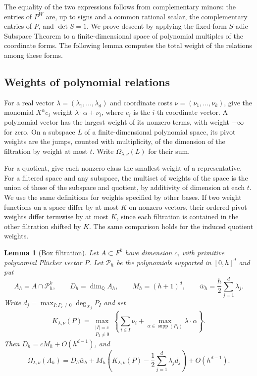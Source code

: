 \documentclass[11pt,a4paper,reqno]{amsart}
\newtheorem{lemma}[theorem]{Lemma}
\theoremstyle{definition}
\theoremstyle{remark}
\numberwithin{equation}{section}
\begin{document}
The equality of the two expressions follows from complementary
minors: the entries of \(P^W\) are, up to signs and a common rational
scalar, the complementary entries of \(P\), and \(\det S=1\).
We prove descent by applying the fixed-form \(S\)-adic Subspace
Theorem to a finite-dimensional space of polynomial multiples of
the coordinate forms. The following lemma computes the total weight
of the relations among these forms.

\subsection{Weights of polynomial relations}

For a real vector \(\lambda=(\lambda_1,\ldots,\lambda_d)\) and coordinate
costs \(\nu=(\nu_1,\ldots,\nu_k)\), give the monomial \(X^\alpha e_i\)
weight \(\lambda\cdot\alpha+\nu_i\), where \(e_i\) is the \(i\)-th
coordinate vector. A polynomial vector has the largest weight of its
nonzero terms, with weight \(-\infty\) for zero. On a subspace \(L\) of
a finite-dimensional polynomial space, its pivot weights are the
jumps, counted with multiplicity, of the dimension of the filtration
by weight at most \(t\). Write \(\Omega_{\lambda,\nu}(L)\) for their sum.

For a quotient, give each nonzero class the smallest weight of a
representative. For a filtered space and any subspace, the multiset
of weights of the space is the union of those of the subspace and
quotient, by additivity of dimension at each \(t\). We use the same
definitions for weights specified by other bases. If two weight
functions on a space differ by at most \(K\) on nonzero vectors,
their ordered pivot weights differ termwise by at most \(K\), since
each filtration is contained in the other filtration shifted by \(K\).
The same comparison holds for the induced quotient weights.

\begin{lemma}[Box filtration]\label{lem:box-filtration}
Let \(A\subset F^k\) have dimension \(c\), with primitive polynomial
Pl\"ucker vector \(P\). Let \(\mathcal P_h\) be the polynomials supported
in \([0,h]^d\) and put
\[
 A_h=A\cap\mathcal P_h^k,\qquad D_h=\dim_{\mathbb Q} A_h,\qquad
 M_h=(h+1)^d,\qquad \overline w_h=\frac h2\sum_{j=1}^d\lambda_j .
\]
Write \(d_j=\max_{I:P_I\ne0}\deg_{X_j}P_I\) and set
\[
 K_{\lambda,\nu}(P)=
 \max_{\substack{|I|=c\\P_I\ne0}}
   \left\{\sum_{i\in I}\nu_i+
          \max_{\alpha\in\operatorname{supp}(P_I)}\lambda\cdot\alpha\right\}.
\]
Then \(D_h=cM_h+O(h^{d-1})\), and
\begin{equation}\label{eq:box-filtration}
 \Omega_{\lambda,\nu}(A_h)
   =D_h\overline w_h+
     M_h\left(K_{\lambda,\nu}(P)-\frac12\sum_{j=1}^d\lambda_jd_j\right)
     +O(h^{d-1}).
\end{equation}
\end{lemma}
\end{document}
